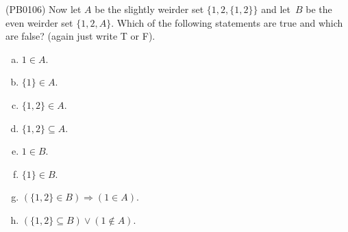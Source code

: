 (PB0106) Now let $A$ be the slightly weirder set $\{1,2,\{1,2\}\}$ and let~$B$ be the even weirder set $\{1,2,A\}$. Which of the following statements are true and which are false? (again just write T or F).
\begin{multicols}{2}
\begin{enumerate}[(a)]
\item $1\in A$. 
\item $\{1\}\in A$.
\item $\{1,2\}\in A$.
\item $\{1,2\}\subseteq A$.
\item $1\in B$.
\item $\{1\}\in B$.
\item $(\{1,2\}\in B)\Rightarrow(1\in A)$.
\item $(\{1,2\}\subseteq B)\vee(1\not\in A).$
\end{enumerate}
\end{multicols}
